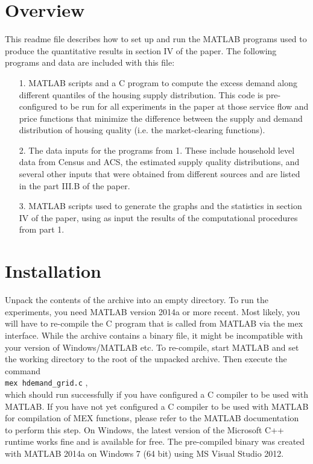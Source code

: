 \documentclass[letterpaper,12pt]{article}
\begin{document}
\section{Overview}

This readme file describes how to set up and run the MATLAB programs used to produce the quantitative results in section IV of the paper.
The following programs and data are included with this file:
\begin{itemize}
	\item[1.] MATLAB scripts and a C program to compute the excess demand along different quantiles of the housing supply distribution. This code is pre-configured to be run for all experiments in the paper at those service flow and price functions that minimize the difference between the supply and demand distribution of housing quality (i.e. the market-clearing functions).
	\item[2.] The data inputs for the programs from 1. These include household level data from Census and ACS, the estimated supply quality distributions, and several other inputs that were obtained from different sources and are listed in the part III.B of the paper.
	\item[3.] MATLAB scripts used to generate the graphs and the statistics in section IV of the paper, using as input the results of the computational procedures from part 1.
\end{itemize}


\section{Installation}

Unpack the contents of the archive into an empty directory. To run the experiments, you need MATLAB version 2014a or more recent. Most likely, you will have to re-compile the C program that is called from MATLAB via the mex interface. While the archive contains a binary file, it might be incompatible with your version of Windows/MATLAB etc. To re-compile, start MATLAB and set the working directory to the root of the unpacked archive. Then execute the command\\
\verb|mex hdemand_grid.c| ,\\
which should run successfully if you have configured a C compiler to be used with MATLAB. If you have not yet configured a C compiler to be used with MATLAB for compilation of MEX functions, please refer to the MATLAB documentation to perform this step. On Windows, the latest version of the Microsoft C++ runtime works fine and is available for free. The pre-compiled binary was created with MATLAB 2014a on Windows 7 (64 bit) using MS Visual Studio 2012.
\end{document}
